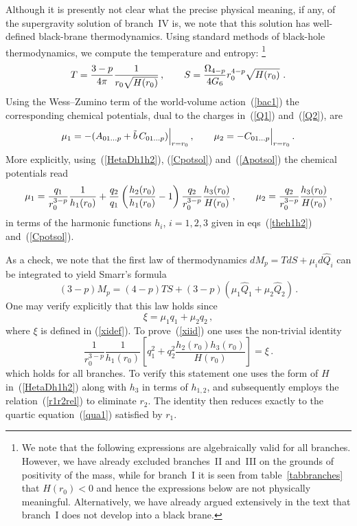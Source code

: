 \documentclass[a4paper,11pt]{article}
\newcommand{\eqref}[1]{(\ref{#1})}
\begin{document}
Although it is presently not clear what the precise physical meaning, if
any, of the supergravity solution of branch~IV is, we note that this solution
has well-defined black-brane thermodynamics. Using standard methods of
black-hole thermodynamics, we compute the temperature and entropy:%
\footnote{We note that the following expressions are algebraically valid
for all branches. However, we have already excluded branches~II and~III
on the grounds of positivity of the mass, while for branch~I it is seen from
table~\ref{tabbranches} that $H(r_0) < 0$ and hence the expressions below
are not physically meaningful. Alternatively, we have already argued
extensively in the text that branch~I does not develop into a black brane.}
%
\begin{equation}
T = \frac{3-p}{4\pi} \frac{1}{r_0\sqrt{H(r_0)}} \,,\qquad
S = \frac{\Omega_{4-p}}{4 G_6 } r_0^{4-p} \sqrt{H(r_0)} \ .
\end{equation}
%
Using the Wess--Zumino term of the world-volume action~\eqref{bac1}
the corresponding chemical potentials, dual to the charges in~\eqref{Q1}
and~\eqref{Q2}, are
\begin{equation}
\mu_1 = - (A_{01\ldots p} + \tilde{b}\,C_{0 1 \ldots p}) \Big\vert_{r=r_0} \,,\qquad
\mu_2 = - C_{0 1 \ldots p} \Big\vert_{r=r_0} \,.
\end{equation}
More explicitly, using~\eqref{HetaDh1h2}, \eqref{Cpotsol}
and~\eqref{Apotsol} the chemical potentials read    
\begin{equation}
\mu_1 = \frac{q_1}{r_0^{3-p}} \frac{1}{h_1(r_0)} + \frac{q_2}{q_1} \left(
\frac{h_2(r_0)}{h_1(r_0)} -1 \right)
\frac{q_2}{r_0^{3-p}} \frac{h_3(r_0)}{H(r_0)} \,,\qquad
\mu_2 = \frac{q_2}{r_0^{3-p}} \frac{h_3(r_0)}{H(r_0)} \,,
\end{equation}
in terms of the harmonic functions $h_i$, $i=1,2,3$ given in
eqs~\eqref{theh1h2} and~\eqref{Cpotsol}.

As a check, we note that the first law of thermodynamics
$d M_p = T d S + \mu_i d \hat{Q}_i$ can be integrated to yield Smarr's formula
%
\begin{equation}
(3-p) M_p = (4-p) TS + (3-p)(\mu_1 \hat{Q}_1 + \mu_2 \hat{Q}_2) \,.
\end{equation}
%
One may verify explicitly that this law holds since
%
\begin{equation}
\label{xiid}
\xi = \mu_1 q_1 + \mu_2 q_2 \,,
\end{equation}
%
where $\xi $ is defined in \eqref{xidef}. To prove~\eqref{xiid} one
uses the non-trivial identity
\begin{equation}
\label{ntid}
\frac{1}{r_0^{3-p}} \frac{1}{h_1(r_0)} \left[ q_1^2 + q_2^2
\frac{h_2(r_0) h_3 (r_0)}{H(r_0)} \right] = \xi \,.
\end{equation}
which holds for all branches. To verify this statement one uses the
form of $H$ in~\eqref{HetaDh1h2} along with $h_3$ in terms of $h_{1,2}$,
and subsequently employs the relation~\eqref{r1r2rel} to eliminate $r_2$.
The identity then reduces exactly to the quartic equation~\eqref{qua1}
satisfied by $r_1$.
\end{document}
